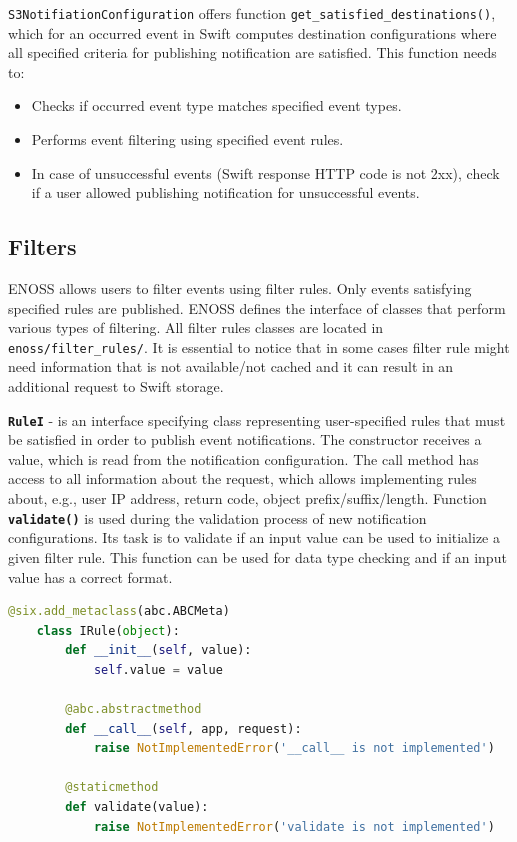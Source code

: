    \texttt{S3NotifiationConfiguration} offers function \texttt{get\_satisfied\_destinations()}, which for an occurred event in Swift computes destination configurations where all specified criteria for publishing notification are satisfied. This function needs to:
    \begin{itemize}
        \item Checks if occurred event type matches specified event types.
        \item Performs event filtering using specified event rules.
        \item In case of unsuccessful events (Swift response HTTP code is not 2xx), check if a user allowed publishing notification for unsuccessful events.
    \end{itemize}

    \subsection{Filters}
    ENOSS allows users to filter events using filter rules. Only events satisfying specified rules are published. ENOSS defines the interface of classes that perform various types of filtering. All filter rules classes are located in \texttt{enoss/filter\_rules/}. It is essential to notice that in some cases filter rule might need information that is not available/not cached and it can result in an additional request to Swift storage.

    \textbf{\texttt{RuleI}} - is an interface specifying class representing user-specified rules that must be satisfied in order to publish event notifications. The constructor receives a value, which is read from the notification configuration. The call method has access to all information about the request, which allows implementing rules about, e.g., user IP address, return code, object prefix/suffix/length. Function \textbf{\texttt{validate()}} is used during the validation process of new notification configurations. Its task is to validate if an input value can be used to initialize a given filter rule. This function can be used for data type checking and if an input value has a correct format.

    \begin{lstlisting}[language=Python, style=pythonStyle, caption=Interface of class representing filter rule., label=lst:enoss-rulei]
    @six.add_metaclass(abc.ABCMeta)
    class IRule(object):
        def __init__(self, value):
            self.value = value

        @abc.abstractmethod
        def __call__(self, app, request):
            raise NotImplementedError('__call__ is not implemented')

        @staticmethod
        def validate(value):
            raise NotImplementedError('validate is not implemented')
    \end{lstlisting}

